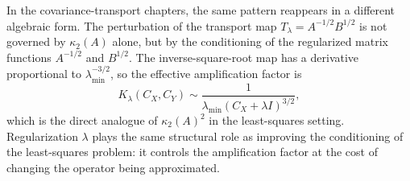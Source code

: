 In the covariance-transport chapters, the same pattern reappears in a different
algebraic form. The perturbation of the transport map \(T_\lambda = A^{-1/2}
B^{1/2}\) is not governed by \(\kappa_2(A)\) alone, but by the conditioning of
the regularized matrix functions \(A^{-1/2}\) and \(B^{1/2}\). The
inverse-square-root map has a derivative proportional to \(\lambda_{\min}^{-3/2}\),
so the effective amplification factor is
\[
	K_\lambda(C_X, C_Y)
	\sim
	\frac{1}{\lambda_{\min}(C_X + \lambda I)^{3/2}},
\]
which is the direct analogue of \(\kappa_2(A)^2\) in the least-squares setting.
Regularization \(\lambda\) plays the same structural role as improving the
conditioning of the least-squares problem: it controls the amplification factor
at the cost of changing the operator being approximated.
